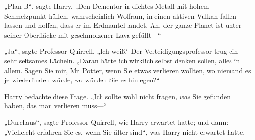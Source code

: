„Plan B“, sagte Harry. „Den Dementor in dichtes Metall mit hohem Schmelzpunkt hüllen, wahrscheinlich Wolfram, in einen aktiven Vulkan fallen lassen und hoffen, dass er im Erdmantel landet. Ah, der ganze Planet ist unter seiner Oberfläche mit geschmolzener Lava gefüllt—“

„Ja“, sagte Professor Quirrell. „Ich weiß.“ Der Verteidigungsprofessor trug ein sehr seltsames Lächeln. „Daran hätte ich wirklich selbst denken sollen, alles in allem. Sagen Sie mir, Mr~Potter, wenn Sie etwas verlieren wollten, wo niemand es je wiederfinden würde, wo würden Sie es hinlegen?“

Harry bedachte diese Frage. „Ich sollte wohl nicht fragen, \emph{was} Sie gefunden haben, das man verlieren muss—“

„Durchaus“, sagte Professor Quirrell, wie Harry erwartet hatte; und dann: „Vielleicht erfahren Sie es, wenn Sie älter sind“, was Harry nicht erwartet hatte.

